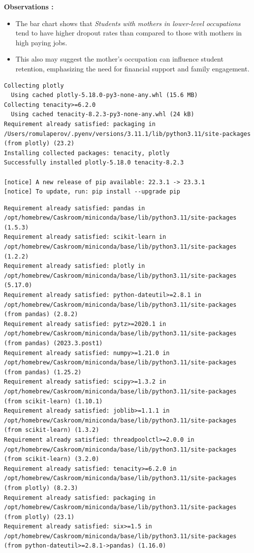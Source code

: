 \documentclass[
  letterpaper,
  DIV=11,
  numbers=noendperiod]{scrartcl}
\begin{document}
\textbf{Observations :}

\begin{itemize}
\item
  The bar chart shows that \emph{Students with mothers in lower-level
  occupations} tend to have higher dropout rates than compared to those
  with mothers in high paying jobs.
\item
  This also may suggest the mother's occupation can influence student
  retention, emphasizing the need for financial support and family
  engagement.
\end{itemize}

\begin{verbatim}
Collecting plotly
  Using cached plotly-5.18.0-py3-none-any.whl (15.6 MB)
Collecting tenacity>=6.2.0
  Using cached tenacity-8.2.3-py3-none-any.whl (24 kB)
Requirement already satisfied: packaging in /Users/romulaperov/.pyenv/versions/3.11.1/lib/python3.11/site-packages (from plotly) (23.2)
Installing collected packages: tenacity, plotly
Successfully installed plotly-5.18.0 tenacity-8.2.3

[notice] A new release of pip available: 22.3.1 -> 23.3.1
[notice] To update, run: pip install --upgrade pip
\end{verbatim}

\begin{verbatim}
Requirement already satisfied: pandas in /opt/homebrew/Caskroom/miniconda/base/lib/python3.11/site-packages (1.5.3)
Requirement already satisfied: scikit-learn in /opt/homebrew/Caskroom/miniconda/base/lib/python3.11/site-packages (1.2.2)
Requirement already satisfied: plotly in /opt/homebrew/Caskroom/miniconda/base/lib/python3.11/site-packages (5.17.0)
Requirement already satisfied: python-dateutil>=2.8.1 in /opt/homebrew/Caskroom/miniconda/base/lib/python3.11/site-packages (from pandas) (2.8.2)
Requirement already satisfied: pytz>=2020.1 in /opt/homebrew/Caskroom/miniconda/base/lib/python3.11/site-packages (from pandas) (2023.3.post1)
Requirement already satisfied: numpy>=1.21.0 in /opt/homebrew/Caskroom/miniconda/base/lib/python3.11/site-packages (from pandas) (1.25.2)
Requirement already satisfied: scipy>=1.3.2 in /opt/homebrew/Caskroom/miniconda/base/lib/python3.11/site-packages (from scikit-learn) (1.10.1)
Requirement already satisfied: joblib>=1.1.1 in /opt/homebrew/Caskroom/miniconda/base/lib/python3.11/site-packages (from scikit-learn) (1.3.2)
Requirement already satisfied: threadpoolctl>=2.0.0 in /opt/homebrew/Caskroom/miniconda/base/lib/python3.11/site-packages (from scikit-learn) (3.2.0)
Requirement already satisfied: tenacity>=6.2.0 in /opt/homebrew/Caskroom/miniconda/base/lib/python3.11/site-packages (from plotly) (8.2.3)
Requirement already satisfied: packaging in /opt/homebrew/Caskroom/miniconda/base/lib/python3.11/site-packages (from plotly) (23.1)
Requirement already satisfied: six>=1.5 in /opt/homebrew/Caskroom/miniconda/base/lib/python3.11/site-packages (from python-dateutil>=2.8.1->pandas) (1.16.0)
\end{verbatim}
\end{document}
